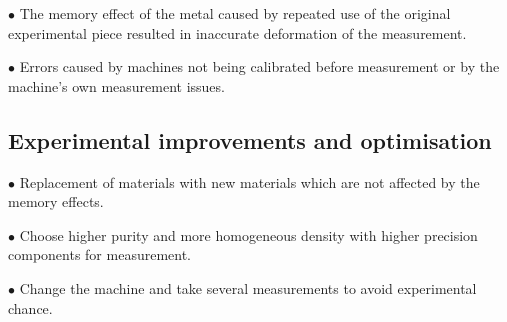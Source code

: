 $\bullet$ The memory effect of the metal caused by repeated use of the original 
experimental piece resulted in inaccurate deformation of the measurement.

$\bullet$ Errors caused by machines not being calibrated before measurement or 
by the machine's own measurement issues.

\subsection*{Experimental improvements and optimisation}

$\bullet$ Replacement of materials with new materials which are not affected by 
the memory effects.

$\bullet$ Choose higher purity and more homogeneous density with higher precision 
components for measurement.

$\bullet$ Change the machine and take several measurements to avoid experimental chance.